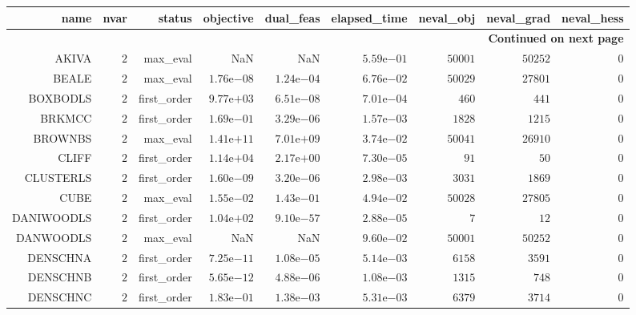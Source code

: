 \begin{longtable}{rrrrrrrrr}
\hline
name & nvar & status & objective & dual\_feas & elapsed\_time & neval\_obj & neval\_grad & neval\_hess \\\hline
\endhead
\hline
\multicolumn{9}{r}{{\bfseries Continued on next page}}\\
\hline
\endfoot
\endlastfoot
AKIVA & \(     2\) & max\_eval &       NaN &       NaN & \( 5.59\)e\(-01\) & \( 50001\) & \( 50252\) & \(     0\) \\
BEALE & \(     2\) & max\_eval & \( 1.76\)e\(-08\) & \( 1.24\)e\(-04\) & \( 6.76\)e\(-02\) & \( 50029\) & \( 27801\) & \(     0\) \\
BOXBODLS & \(     2\) & first\_order & \( 9.77\)e\(+03\) & \( 6.51\)e\(-08\) & \( 7.01\)e\(-04\) & \(   460\) & \(   441\) & \(     0\) \\
BRKMCC & \(     2\) & first\_order & \( 1.69\)e\(-01\) & \( 3.29\)e\(-06\) & \( 1.57\)e\(-03\) & \(  1828\) & \(  1215\) & \(     0\) \\
BROWNBS & \(     2\) & max\_eval & \( 1.41\)e\(+11\) & \( 7.01\)e\(+09\) & \( 3.74\)e\(-02\) & \( 50041\) & \( 26910\) & \(     0\) \\
CLIFF & \(     2\) & first\_order & \( 1.14\)e\(+04\) & \( 2.17\)e\(+00\) & \( 7.30\)e\(-05\) & \(    91\) & \(    50\) & \(     0\) \\
CLUSTERLS & \(     2\) & first\_order & \( 1.60\)e\(-09\) & \( 3.20\)e\(-06\) & \( 2.98\)e\(-03\) & \(  3031\) & \(  1869\) & \(     0\) \\
CUBE & \(     2\) & max\_eval & \( 1.55\)e\(-02\) & \( 1.43\)e\(-01\) & \( 4.94\)e\(-02\) & \( 50028\) & \( 27805\) & \(     0\) \\
DANIWOODLS & \(     2\) & first\_order & \( 1.04\)e\(+02\) & \( 9.10\)e\(-57\) & \( 2.88\)e\(-05\) & \(     7\) & \(    12\) & \(     0\) \\
DANWOODLS & \(     2\) & max\_eval &       NaN &       NaN & \( 9.60\)e\(-02\) & \( 50001\) & \( 50252\) & \(     0\) \\
DENSCHNA & \(     2\) & first\_order & \( 7.25\)e\(-11\) & \( 1.08\)e\(-05\) & \( 5.14\)e\(-03\) & \(  6158\) & \(  3591\) & \(     0\) \\
DENSCHNB & \(     2\) & first\_order & \( 5.65\)e\(-12\) & \( 4.88\)e\(-06\) & \( 1.08\)e\(-03\) & \(  1315\) & \(   748\) & \(     0\) \\
DENSCHNC & \(     2\) & first\_order & \( 1.83\)e\(-01\) & \( 1.38\)e\(-03\) & \( 5.31\)e\(-03\) & \(  6379\) & \(  3714\) & \(     0\) \\

\end{longtable}
